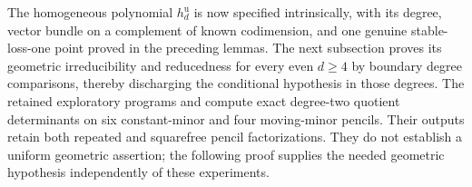 \begin{remark}
The homogeneous polynomial $h_d^{\mathrm u}$ is now specified
intrinsically, with its degree, vector bundle on a complement of
known codimension, and one genuine stable-loss-one point proved
in the preceding lemmas. The next subsection proves its geometric irreducibility and
reducedness for every even $d\ge4$ by boundary degree comparisons,
thereby discharging the conditional hypothesis in those degrees.
The retained exploratory programs
 and
compute exact degree-two quotient determinants on six constant-minor
and four moving-minor pencils. Their outputs retain both repeated
and squarefree pencil factorizations. They do not establish a
uniform geometric assertion; the following proof supplies the needed
geometric hypothesis independently of these experiments.
\end{remark}
